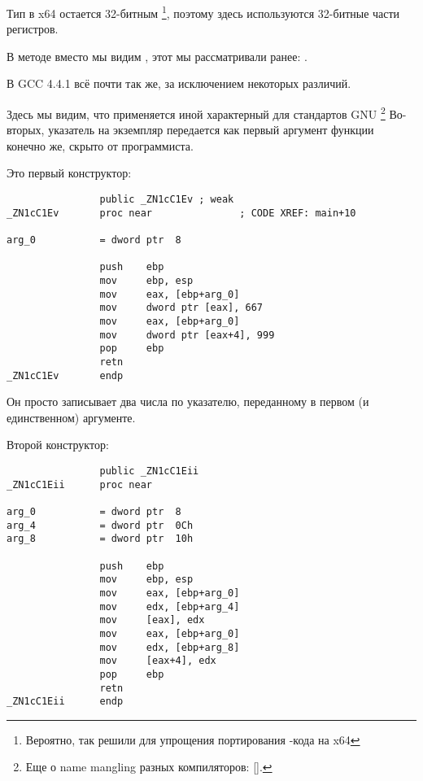 

Тип \Tint в x64 остается 32-битным
\footnote{Вероятно, так решили для упрощения портирования \CCpp{}-кода на x64}, 
поэтому здесь используются 32-битные части регистров.

В методе  вместо \RET мы видим , этот  мы рассматривали ранее: .


В GCC 4.4.1 всё почти так же, за исключением некоторых различий.



Здесь мы видим, что применяется иной  характерный для стандартов GNU
\footnote{Еще о name mangling разных компиляторов: [\AgnerFogCC].}
Во-вторых, указатель на экземпляр передается как первый аргумент функции\EMDASH{} 
конечно же, скрыто от программиста.

Это первый конструктор:

\begin{lstlisting}
                public _ZN1cC1Ev ; weak
_ZN1cC1Ev       proc near               ; CODE XREF: main+10

arg_0           = dword ptr  8

                push    ebp
                mov     ebp, esp
                mov     eax, [ebp+arg_0]
                mov     dword ptr [eax], 667
                mov     eax, [ebp+arg_0]
                mov     dword ptr [eax+4], 999
                pop     ebp
                retn
_ZN1cC1Ev       endp
\end{lstlisting}

Он просто записывает два числа по указателю, переданному в первом (и единственном) аргументе.

Второй конструктор:

\begin{lstlisting}
                public _ZN1cC1Eii
_ZN1cC1Eii      proc near

arg_0           = dword ptr  8
arg_4           = dword ptr  0Ch
arg_8           = dword ptr  10h

                push    ebp
                mov     ebp, esp
                mov     eax, [ebp+arg_0]
                mov     edx, [ebp+arg_4]
                mov     [eax], edx
                mov     eax, [ebp+arg_0]
                mov     edx, [ebp+arg_8]
                mov     [eax+4], edx
                pop     ebp
                retn
_ZN1cC1Eii      endp
\end{lstlisting}

